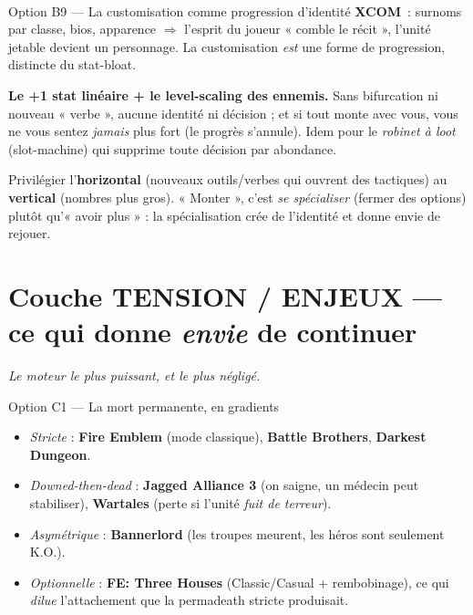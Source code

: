 \documentclass[11pt,a4paper]{article}
\newcommand{\dv}{\,\textsuperscript{\textcolor{accent2}{\textdagger}}}
\newcommand{\jeu}[1]{\textbf{#1}}
\begin{document}
\begin{optionbox}{Option B9 --- La customisation comme progression d'identité}
\jeu{XCOM}\dv{} : surnoms par classe, bios, apparence $\Rightarrow$ l'esprit du joueur « comble le récit », l'unité jetable devient un personnage. La customisation \emph{est} une forme de progression, distincte du stat-bloat.
\end{optionbox}

\begin{antipat}
\textbf{Le +1 stat linéaire + le level-scaling des ennemis.} Sans bifurcation ni nouveau « verbe », aucune identité ni décision ; et si tout monte avec vous, vous ne vous sentez \emph{jamais} plus fort (le progrès s'annule). Idem pour le \emph{robinet à loot} (slot-machine) qui supprime toute décision par abondance.
\end{antipat}

\begin{principe}
Privilégier l'\textbf{horizontal} (nouveaux outils/verbes qui ouvrent des tactiques) au \textbf{vertical} (nombres plus gros). « Monter », c'est \emph{se spécialiser} (fermer des options) plutôt qu'« avoir plus » : la spécialisation crée de l'identité et donne envie de rejouer.
\end{principe}

\section{Couche TENSION / ENJEUX --- ce qui donne \emph{envie} de continuer}
\emph{Le moteur le plus puissant, et le plus négligé.}

\begin{optionbox}{Option C1 --- La mort permanente, en gradients}
\begin{itemize}
\item \emph{Stricte} : \jeu{Fire Emblem} (mode classique), \jeu{Battle Brothers}, \jeu{Darkest Dungeon}.
\item \emph{Downed-then-dead} : \jeu{Jagged Alliance 3} (on saigne, un médecin peut stabiliser), \jeu{Wartales} (perte si l'unité \emph{fuit de terreur}).
\item \emph{Asymétrique} : \jeu{Bannerlord} (les troupes meurent, les héros sont seulement K.O.).
\item \emph{Optionnelle} : \jeu{FE: Three Houses} (Classic/Casual + rembobinage), ce qui \emph{dilue} l'attachement que la permadeath stricte produisait.
\end{itemize}
\end{optionbox}
\end{document}
